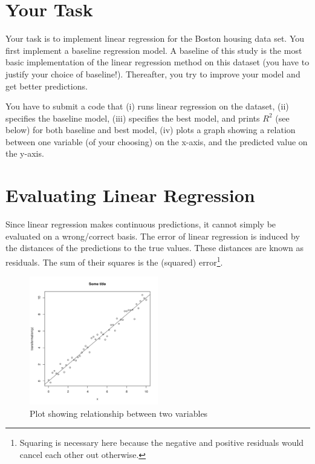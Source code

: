 \documentclass[11pt, leqno, a4paper]{article}
\begin{document}
\section{Your Task}

Your task is to implement linear regression for the Boston housing data set. You first implement a baseline regression model. A baseline of this study is the most basic implementation of the linear regression method on this dataset (you have to justify your choice of 
baseline!). Thereafter, you try to improve your model and get better predictions.

You have to submit a code that (i) runs linear regression on the dataset, (ii) specifies the baseline model, (iii) specifies the best model, and prints $R^{2}$ (see below) for both baseline and best model, (iv) plots a graph showing a relation between one variable (of your choosing) on the x-axis, and the predicted value on the y-axis.

\section{Evaluating Linear Regression}

Since linear regression makes continuous predictions, it cannot simply be evaluated on a wrong/correct
basis. The error of linear regression is induced by the distances of the predictions to the true values.
These distances are known as residuals. The sum of their squares is the (squared) error\footnote{Squaring
is necessary here because the negative and positive residuals would cancel each other out otherwise.}. 

\begin{figure}
    \begin{center}
    \includegraphics[width=0.5\textwidth]{plot.pdf}
    \end{center}
    \caption{Plot showing relationship between two variables\label{fig1}}
\end{figure}
\end{document}
